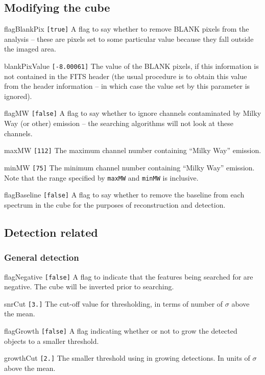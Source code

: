 \documentclass[12pt,a4paper]{article}
\newcommand{\entrylabel}[1]{\mbox{\textsf{\bf{#1:}}}\hfil}
\newenvironment{entry}
        {\begin{list}{}%
                {\renewcommand{\makelabel}{\entrylabel}%
                        \setlength{\labelwidth}{30mm}%
                        \setlength{\labelsep}{5pt}%
                        \setlength{\itemsep}{2pt}%
                        \setlength{\parsep}{2pt}%
                        \setlength{\leftmargin}{35mm}%
                }%
        }%
{\end{list}}
\begin{document}
\subsection*{Modifying the cube}
\begin{entry}
\item[flagBlankPix \texttt{[true]}] A flag to say whether to remove BLANK
  pixels from the analysis -- these are pixels set to some particular
  value because they fall outside the imaged area.
\item[blankPixValue \texttt{[-8.00061]}] The value of the BLANK pixels,
  if this information is not contained in the FITS header (the usual
  procedure is to obtain this value from the header information -- in
  which case the value set by this parameter is ignored).
\item[flagMW \texttt{[false]}] A flag to say whether to ignore channels
  contaminated by Milky Way (or other) emission -- the searching
  algorithms will not look at these channels.
\item[maxMW \texttt{[112]}] The maximum channel number containing
  ``Milky Way'' emission.
\item[minMW \texttt{[75]}] The minimum channel number containing
  ``Milky Way'' emission. Note that the range specified by
  \texttt{maxMW} and \texttt{minMW} is inclusive.
\item[flagBaseline \texttt{[false]}] A flag to say whether to remove the
  baseline from each spectrum in the cube for the purposes of
  reconstruction and detection.
\end{entry}

\subsection*{Detection related}

\subsubsection*{General detection}
\begin{entry}
\item[flagNegative \texttt{[false]}] A flag to indicate that the features
  being searched for are negative. The cube will be inverted prior to
  searching. 
\item[snrCut \texttt{[3.]}] The cut-off value for thresholding, in terms
  of number of $\sigma$ above the mean.
\item[flagGrowth \texttt{[false]}] A flag indicating whether or not to
  grow the detected objects to a smaller threshold.
\item[growthCut \texttt{[2.]}] The smaller threshold using in growing
  detections. In units of $\sigma$ above the mean.
\end{entry}
\end{document}
